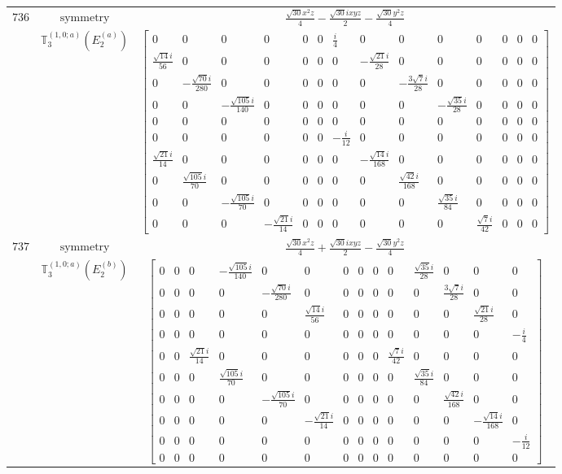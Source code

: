 \documentclass[fleqn,8pt,landscape]{jsarticle}
\begin{document}
\begin{longtable}{ccc}
$ 736 $ & $ \text{symmetry} $ & $ \frac{\sqrt{30} x^{2} z}{4} - \frac{\sqrt{30} i x y z}{2} - \frac{\sqrt{30} y^{2} z}{4} $ \\
$  $ & $ \mathbb{T}_{3}^{(1,0;a)}(E_{2}^{(a)}) $ & $ \begin{bmatrix} 0 & 0 & 0 & 0 & 0 & 0 & \frac{i}{4} & 0 & 0 & 0 & 0 & 0 & 0 & 0 \\ \frac{\sqrt{14} i}{56} & 0 & 0 & 0 & 0 & 0 & 0 & - \frac{\sqrt{21} i}{28} & 0 & 0 & 0 & 0 & 0 & 0 \\ 0 & - \frac{\sqrt{70} i}{280} & 0 & 0 & 0 & 0 & 0 & 0 & - \frac{3 \sqrt{7} i}{28} & 0 & 0 & 0 & 0 & 0 \\ 0 & 0 & - \frac{\sqrt{105} i}{140} & 0 & 0 & 0 & 0 & 0 & 0 & - \frac{\sqrt{35} i}{28} & 0 & 0 & 0 & 0 \\ 0 & 0 & 0 & 0 & 0 & 0 & 0 & 0 & 0 & 0 & 0 & 0 & 0 & 0 \\ 0 & 0 & 0 & 0 & 0 & 0 & - \frac{i}{12} & 0 & 0 & 0 & 0 & 0 & 0 & 0 \\ \frac{\sqrt{21} i}{14} & 0 & 0 & 0 & 0 & 0 & 0 & - \frac{\sqrt{14} i}{168} & 0 & 0 & 0 & 0 & 0 & 0 \\ 0 & \frac{\sqrt{105} i}{70} & 0 & 0 & 0 & 0 & 0 & 0 & \frac{\sqrt{42} i}{168} & 0 & 0 & 0 & 0 & 0 \\ 0 & 0 & - \frac{\sqrt{105} i}{70} & 0 & 0 & 0 & 0 & 0 & 0 & \frac{\sqrt{35} i}{84} & 0 & 0 & 0 & 0 \\ 0 & 0 & 0 & - \frac{\sqrt{21} i}{14} & 0 & 0 & 0 & 0 & 0 & 0 & \frac{\sqrt{7} i}{42} & 0 & 0 & 0 \end{bmatrix} $ \\ \hline
$ 737 $ & $ \text{symmetry} $ & $ \frac{\sqrt{30} x^{2} z}{4} + \frac{\sqrt{30} i x y z}{2} - \frac{\sqrt{30} y^{2} z}{4} $ \\
$  $ & $ \mathbb{T}_{3}^{(1,0;a)}(E_{2}^{(b)}) $ & $ \begin{bmatrix} 0 & 0 & 0 & - \frac{\sqrt{105} i}{140} & 0 & 0 & 0 & 0 & 0 & 0 & \frac{\sqrt{35} i}{28} & 0 & 0 & 0 \\ 0 & 0 & 0 & 0 & - \frac{\sqrt{70} i}{280} & 0 & 0 & 0 & 0 & 0 & 0 & \frac{3 \sqrt{7} i}{28} & 0 & 0 \\ 0 & 0 & 0 & 0 & 0 & \frac{\sqrt{14} i}{56} & 0 & 0 & 0 & 0 & 0 & 0 & \frac{\sqrt{21} i}{28} & 0 \\ 0 & 0 & 0 & 0 & 0 & 0 & 0 & 0 & 0 & 0 & 0 & 0 & 0 & - \frac{i}{4} \\ 0 & 0 & \frac{\sqrt{21} i}{14} & 0 & 0 & 0 & 0 & 0 & 0 & \frac{\sqrt{7} i}{42} & 0 & 0 & 0 & 0 \\ 0 & 0 & 0 & \frac{\sqrt{105} i}{70} & 0 & 0 & 0 & 0 & 0 & 0 & \frac{\sqrt{35} i}{84} & 0 & 0 & 0 \\ 0 & 0 & 0 & 0 & - \frac{\sqrt{105} i}{70} & 0 & 0 & 0 & 0 & 0 & 0 & \frac{\sqrt{42} i}{168} & 0 & 0 \\ 0 & 0 & 0 & 0 & 0 & - \frac{\sqrt{21} i}{14} & 0 & 0 & 0 & 0 & 0 & 0 & - \frac{\sqrt{14} i}{168} & 0 \\ 0 & 0 & 0 & 0 & 0 & 0 & 0 & 0 & 0 & 0 & 0 & 0 & 0 & - \frac{i}{12} \\ 0 & 0 & 0 & 0 & 0 & 0 & 0 & 0 & 0 & 0 & 0 & 0 & 0 & 0 \end{bmatrix} $ \\ \hline

\end{longtable}
\end{document}
